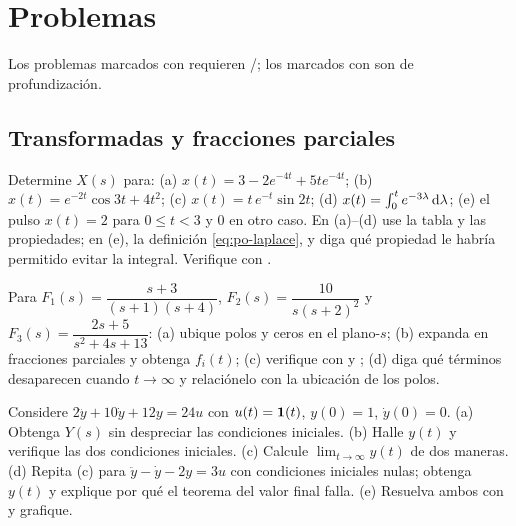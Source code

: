 \section{Problemas}
\label{sec:po-problemas}

Los problemas marcados con \etiquetaM{} requieren \matlab/\simulink; los marcados con \etiquetaEstrella{} son de profundización.

\subsection*{Transformadas y fracciones parciales}

\begin{problema}[transformadas]\label{prob:po-1}
Determine $X(s)$ para: (a) $x(t)=3-2e^{-4t}+5te^{-4t}$; (b) $x(t)=e^{-2t}\cos3t+4t^2$; (c) $x(t)=t\,e^{-t}\sin2t$; (d) $x(t)=\int_0^t e^{-3\lambda}\,\mathrm{d}\lambda$; (e) el pulso $x(t)=2$ para $0\leq t<3$ y $0$ en otro caso. En (a)--(d) use la tabla y las propiedades; en (e), la definición \eqref{eq:po-laplace}, y diga qué propiedad le habría permitido evitar la integral. \etiquetaM{} Verifique con .
\end{problema}

\begin{problema}\label{prob:po-2}
Para $F_1(s)=\dfrac{s+3}{(s+1)(s+4)}$, $F_2(s)=\dfrac{10}{s(s+2)^2}$ y $F_3(s)=\dfrac{2s+5}{s^2+4s+13}$: (a) ubique polos y ceros en el plano-$s$; (b) expanda en fracciones parciales y obtenga $f_i(t)$; (c) \etiquetaM{} verifique con  y ; (d) diga qué términos desaparecen cuando $t\to\infty$ y relaciónelo con la ubicación de los polos.
\end{problema}

\begin{problema}\label{prob:po-3}
Considere $2\ddot y+10\dot y+12y=24u$ con $u(t)=\mathbf{1}(t)$, $y(0)=1$, $\dot y(0)=0$. (a) Obtenga $Y(s)$ sin despreciar las condiciones iniciales. (b) Halle $y(t)$ y verifique las dos condiciones iniciales. (c) Calcule $\lim_{t\to\infty}y(t)$ de dos maneras. (d) Repita (c) para $\ddot y-\dot y-2y=3u$ con condiciones iniciales nulas; obtenga $y(t)$ y explique por qué el teorema del valor final falla. (e) \etiquetaM{} Resuelva ambos con  y grafique.
\end{problema}

